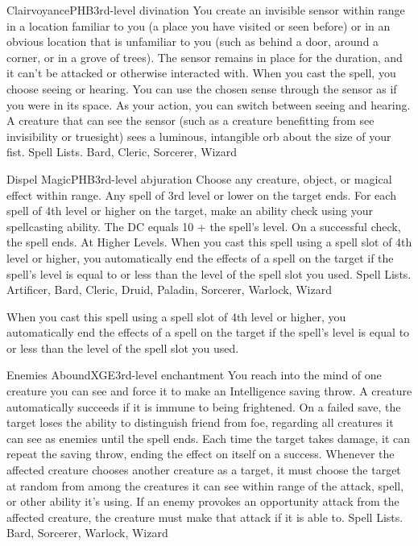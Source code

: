 \begin{spell}{Clairvoyance}{PHB}{3rd-level divination}
{
}
You create an invisible sensor within range in a location familiar to you (a place you have visited or seen before) or in an obvious location that is unfamiliar to you (such as behind a door, around a corner, or in a grove of trees). The sensor remains in place for the duration, and it can’t be attacked or otherwise interacted with.
When you cast the spell, you choose seeing or hearing. You can use the chosen sense through the sensor as if you were in its space. As your action, you can switch between seeing and hearing. A creature that can see the sensor (such as a creature benefitting from see invisibility or truesight) sees a luminous, intangible orb about the size of your fist.
Spell Lists. Bard, Cleric, Sorcerer, Wizard
\end{spell}

\begin{spell}{Dispel Magic}{PHB}{3rd-level abjuration}
{
}
Choose any creature, object, or magical effect within range. Any spell of 3rd level or lower on the target ends. For each spell of 4th level or higher on the target, make an ability check using your spellcasting ability. The DC equals 10 + the spell's level. On a successful check, the spell ends.
At Higher Levels. When you cast this spell using a spell slot of 4th level or higher, you automatically end the effects of a spell on the target if the spell's level is equal to or less than the level of the spell slot you used.
Spell Lists. Artificer, Bard, Cleric, Druid, Paladin, Sorcerer, Warlock, Wizard

 When you cast this spell using a spell slot of 4th level or higher, you automatically end the effects of a spell on the target if the spell's level is equal to or less than the level of the spell slot you used.
\end{spell}

\begin{spell}{Enemies Abound}{XGE}{3rd-level enchantment}
{
}
You reach into the mind of one creature you can see and force it to make an Intelligence saving throw. A creature automatically succeeds if it is immune to being frightened. On a failed save, the target loses the ability to distinguish friend from foe, regarding all creatures it can see as enemies until the spell ends. Each time the target takes damage, it can repeat the saving throw, ending the effect on itself on a success.
Whenever the affected creature chooses another creature as a target, it must choose the target at random from among the creatures it can see within range of the attack, spell, or other ability it’s using. If an enemy provokes an opportunity attack from the affected creature, the creature must make that attack if it is able to.
Spell Lists. Bard, Sorcerer, Warlock, Wizard
\end{spell}

